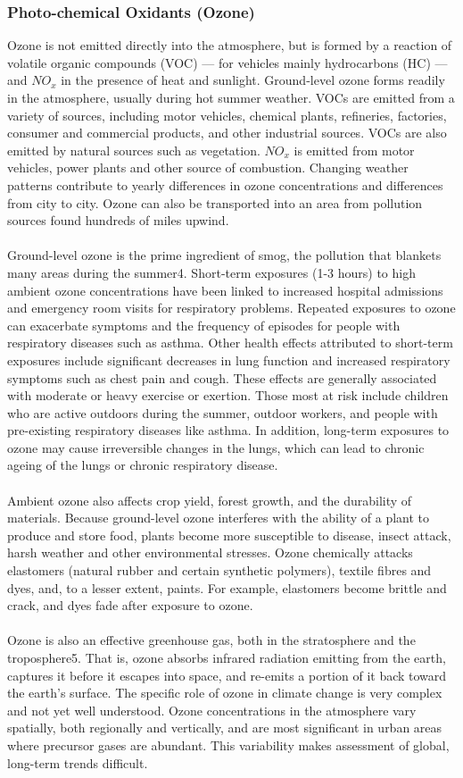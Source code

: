 \subsubsection{Photo-chemical Oxidants (Ozone)}
Ozone is not emitted directly into the atmosphere, but is formed by a reaction of volatile organic compounds (VOC) — for vehicles mainly hydrocarbons (HC) — and $ NO_x $ in the presence of heat and sunlight. Ground-level ozone forms readily in the atmosphere, usually during hot summer weather. VOCs are emitted from a variety of sources, including motor vehicles, chemical plants, refineries, factories, consumer and commercial products, and other industrial sources. VOCs are also emitted by natural sources such as vegetation. $ NO_x $ is emitted from motor vehicles, power plants and other source of combustion. Changing weather patterns contribute to yearly differences in ozone concentrations and differences from city to city. Ozone can also be transported into an area from pollution sources found hundreds of miles upwind.\\\\
Ground-level ozone is the prime ingredient of smog, the pollution that blankets many areas during the summer4. Short-term exposures (1-3 hours) to high ambient ozone concentrations have been linked to increased hospital admissions and emergency room visits for respiratory problems. Repeated exposures to ozone can exacerbate symptoms and the frequency of episodes for people with respiratory diseases such as asthma. Other health effects attributed to short-term exposures include significant decreases in lung function and increased respiratory symptoms such as chest pain and cough. These effects are generally associated with moderate or heavy exercise or exertion. Those most at risk include children who are active outdoors during the summer, outdoor workers, and people with pre-existing respiratory diseases like asthma. In addition, long-term exposures to ozone may cause irreversible changes in the lungs, which can lead to chronic ageing of the lungs or chronic respiratory disease.\\\\
Ambient ozone also affects crop yield, forest growth, and the durability of materials. Because ground-level ozone interferes with the ability of a plant to produce and store food, plants become more susceptible to disease, insect
attack, harsh weather and other environmental stresses. Ozone
chemically attacks elastomers (natural rubber and certain synthetic polymers), textile fibres and dyes, and, to a lesser extent, paints. For example, elastomers become brittle and crack, and dyes fade after exposure to ozone.\\\\
Ozone is also an effective greenhouse gas, both in the stratosphere and the troposphere5. That is, ozone absorbs infrared radiation emitting from the earth, captures it before it escapes into space, and re-emits a portion of it back toward the earth’s surface. The specific role of ozone in climate change is very complex and not yet well understood. Ozone concentrations in the atmosphere vary spatially, both regionally and vertically, and are most significant in urban areas where precursor gases are abundant. This variability makes assessment of global, long-term trends difficult.
